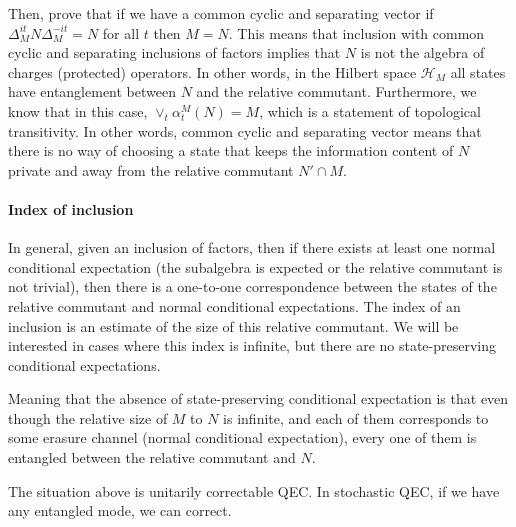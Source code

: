 \documentclass[a4paper,11pt]{article}
\theoremstyle{definition}
\begin{document}
Then, prove that if we have a common cyclic and separating vector if $\Delta_M^{it}N\Delta_M^{-it}=N$ for all $t$ then $M=N$. This means that inclusion with common cyclic and separating inclusions of factors implies that $N$ is not the algebra of charges (protected) operators. In other words, in the Hilbert space $\mathcal{H}_M$ all states have entanglement between $N$ and the relative commutant. Furthermore, we know that in this case, $\vee_t \alpha_t^M(N)=M$, which is a statement of topological transitivity. In other words, common cyclic and separating vector means that there is no way of choosing a state that keeps the information content of $N$ private and away from the relative commutant $N'\cap M$.



\paragraph{Index of inclusion}

In general, given an inclusion of factors, then if there exists at least one normal conditional expectation (the subalgebra is expected or the relative commutant is not trivial), then there is a one-to-one correspondence between the states of the relative commutant and normal conditional expectations. The index of an inclusion is an estimate of the size of this relative commutant. We will be interested in cases where this index is infinite, but there are no state-preserving conditional expectations. 

Meaning that 
the absence of state-preserving conditional expectation is that even though the relative size of $M$ to $N$ is infinite, and each of them corresponds to some erasure channel (normal conditional expectation), every one of them is entangled between the relative commutant and $N$. 

The situation above is unitarily correctable QEC. In stochastic QEC, if we have any entangled mode, we can correct. 








\end{document}
